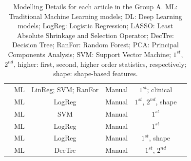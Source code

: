 \documentclass{article}
\begin{document}
\begin{table}[]
\begin{tabular}{cccccc}
        \cite{Liu2022}                      & ML                             & LinReg; SVM; RanFor                            & Manual                        & $1^{st}$; clinical                 \\
        \cite{Ho2019}                       & ML                             & LogReg                                         & Manual                        & $1^{st}$, $2^{nd}$, shape          \\
        \cite{Liu2021}                      & ML                             & SVM                                            & Manual                        & $1^{st}$                           \\
        \cite{Schieda2017}                  & ML                             & LogReg                                         & Manual                        & $1^{st}$                           \\
        \cite{Tu2020}                       & ML                             & LogReg                                         & Manual                        & $1^{st}$, shape                    \\
        \cite{Romeo2018}                    & ML                             & DecTre                                         & Manual                        & $1^{st}$, $2^{nd}$                 \\
        \bottomrule
    \end{tabular}
    \caption{Modelling Details  for each article in the Group A. ML: Traditional Machine Learning models; DL: Deep Learning models; LogReg: Logistic Regression; LASSO: Least Absolute Shrinkage and Selection Operator; DecTre: Decision Tree; RanFor: Random Forest; PCA: Principal Components Analysis; SVM: Support Vector Machine; $1^{st}$, $2^{nd}$, higher: first, second, higher order statistics, respectively; shape: shape-based features.}
    \label{tab:model_A}
\end{table}
\end{document}
